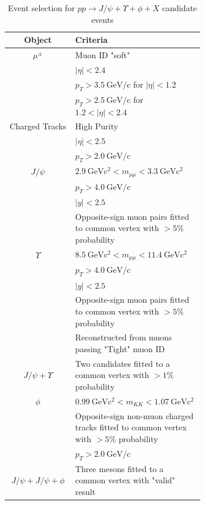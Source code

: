 \documentclass[10pt,twocolumn]{article}
\newcommand*{\GeVc}{~\text{GeV/c}}
\newcommand*{\GeVcs}{~\text{GeV}\text{c}^2}
\begin{document}
\begin{table}[h!]
    \centering
    \caption{Event selection for $pp\to J/\psi+\Upsilon+\phi+X$ candidate events\\}
    \begin{tabular}{c p{0.66\linewidth}}
        \toprule
        \textbf{Object} & \textbf{Criteria} \\
        \midrule
        $\mu^\pm $ & Muon ID "soft" \\
                  & $|\eta| < 2.4$ \\
                  & $p_T > 3.5\GeVc$ for $|\eta| < 1.2$ \\
                  & $p_T > 2.5\GeVc$ for $1.2 < |\eta| < 2.4$ \\
                  \midrule
        Charged Tracks & High Purity \\
                  & $|\eta|<2.5$ \\
                  & $p_T > 2.0 \GeVc$ \\
        \midrule
        $J/\psi$ & $2.9 \GeVcs < m_{\mu\mu} < 3.3 \GeVcs$ \\
                 & $p_T > 4.0\GeVc$ \\
                 & $|y| < 2.5$ \\
                 & Opposite-sign muon pairs fitted to common vertex with $> 5\%$ probability \\
                 \midrule
        $\Upsilon$ & $8.5\GeVcs < m_{\mu\mu} < 11.4 \GeVcs$ \\
                 & $p_T > 4.0\GeVc$ \\
                 & $|y| < 2.5$ \\
                 & Opposite-sign muon pairs fitted to common vertex with $> 5\%$ probability \\
                 & Reconstructed from muons passing "Tight" muon ID \\
                 \midrule
        $J/\psi+\Upsilon$ & Two candidates fitted to a common vertex with $> 1\%$ probability \\
        \midrule
        $\phi$ & $0.99 \GeVcs < m_{KK} < 1.07 \GeVcs$ \\
               & Opposite-sign non-muon charged tracks fitted to common vertex with $> 5\%$ probability \\
               & $p_T > 2.0\GeVc$ \\
               \midrule
        $J/\psi+J/\psi+\phi$ & Three mesons fitted to a common vertex with "valid" result \\
        \bottomrule
    \end{tabular}
    \label{tab:cut_JpsiYPhi}
\end{table}
\end{document}
